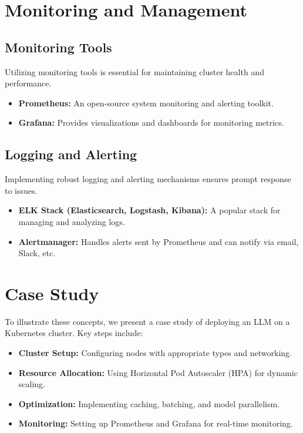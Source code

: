 \section{Monitoring and Management}

\subsection{Monitoring Tools}
Utilizing monitoring tools is essential for maintaining cluster health and performance.
\begin{itemize}
    \item \textbf{Prometheus:} An open-source system monitoring and alerting toolkit.
    \item \textbf{Grafana:} Provides visualizations and dashboards for monitoring metrics.
\end{itemize}

\subsection{Logging and Alerting}
Implementing robust logging and alerting mechanisms ensures prompt response to issues.
\begin{itemize}
    \item \textbf{ELK Stack (Elasticsearch, Logstash, Kibana):} A popular stack for managing and analyzing logs.
    \item \textbf{Alertmanager:} Handles alerts sent by Prometheus and can notify via email, Slack, etc.
\end{itemize}

\section{Case Study}

To illustrate these concepts, we present a case study of deploying an LLM on a Kubernetes cluster. Key steps include:

\begin{itemize}
    \item \textbf{Cluster Setup:} Configuring nodes with appropriate types and networking.
    \item \textbf{Resource Allocation:} Using Horizontal Pod Autoscaler (HPA) for dynamic scaling.
    \item \textbf{Optimization:} Implementing caching, batching, and model parallelism.
    \item \textbf{Monitoring:} Setting up Prometheus and Grafana for real-time monitoring.
\end{itemize}

